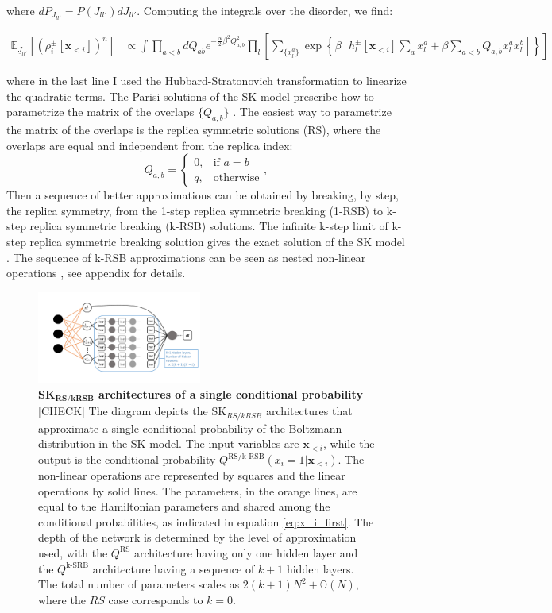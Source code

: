 \documentclass[aps,physrev,10pt,floatfix,reprint]{revtex4-2}
\begin{document}
where $dP_{J_{ll'}}=P(J_{ll'})dJ_{ll'}$.
Computing the integrals over the disorder, we find: 
\begin{widetext}
\begin{align}
\mathbb{E}_{\underline{J}_{ll'}}\left[(\rho_i^{\pm}[\mathbf{x}_{<i}])^n \right]
& \propto  \int \prod_{a<b} dQ_{ab} e^{-\frac{N}{2}\beta^2Q_{a,b}^2}
\prod_{l} \left[
\sum_{\{\underline{x}^{a}_l\}} 
\exp\left\{\beta \left[
h_l^{\pm}[\mathbf{x}_{<i}] \sum_{a} x_l^{a} +\beta \sum_{a<b} Q_{a,b}  x_l^{a} x_l^{b} \right]  \right\}
\right]
\end{align}
\end{widetext}
where in the last line I used the Hubbard-Stratonovich transformation to linearize the quadratic terms. 
The Parisi solutions of the SK model prescribe how to parametrize the matrix of the overlaps $\{Q_{a,b}\}$ \cite{10.1142/0271}. The easiest way to parametrize the matrix of the overlaps is the replica symmetric solutions (RS), where the overlaps are equal and independent from the replica index: 
$$
Q_{a,b}=\begin{cases}
			0, & \text{if $a=b$}\\
            q, & \text{otherwise}
		 \end{cases},
$$
Then a sequence of better approximations can be obtained by breaking, by step, the replica symmetry, from the 1-step replica symmetric breaking (1-RSB) to k-step replica symmetric breaking (k-RSB) solutions. The infinite k-step limit of k-step replica symmetric breaking solution gives the exact solution of the SK model \cite{10.2307/20159953}.
The sequence of k-RSB approximations can be seen as nested non-linear operations \cite{Parisi_1980}, see appendix for details. 
\begin{figure}[!h]
    \centering 
    \includegraphics[width=0.48\textwidth]{img/SK_arch.pdf}
    \caption{\textbf{SK$\mathbf{_{RS/kRSB}}$ architectures of a single conditional probability} [CHECK] The diagram depicts the SK$_{RS/kRSB}$ architectures that approximate a single conditional probability of the Boltzmann distribution in the SK model. The input variables are $\mathbf{x}_{<i}$, while the output is the conditional probability $Q^{\text{RS/k-RSB}}\left(x_{i}=1|\mathbf{x}_{<i}\right)$. The non-linear operations are represented by squares and the linear operations by solid lines. The parameters, in the orange lines, are equal to the Hamiltonian parameters and shared among the conditional probabilities, as indicated in equation \ref{eq:x_i_first}. The depth of the network is determined by the level of approximation used, with the $Q^{\text{RS}}$ architecture having only one hidden layer and the $Q^{\text{k-SRB}}$ architecture having a sequence of $k+1$ hidden layers. The total number of parameters scales as $2(k+1)N^2 + \mathbb{O}(N)$, where the $RS$ case corresponds to $k=0$.}
    \label{fig:SK_arch}
\end{figure}
\end{document}
